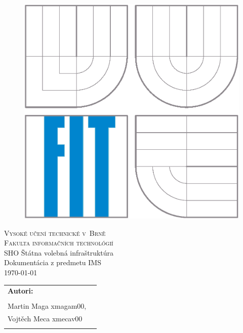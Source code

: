 \begin{titlepage}

\begin{figure}[h]
\begin{center}
\includegraphics[scale=0.6]{logo.eps}
\end{center}
\end{figure}

\begin{center}
\LARGE
\textsc{Vysoké učení
  technické v~Brně\\ \Large{Fakulta informačních technológií}}\\
\LARGE
SHO Štátna volebná infraštruktúra \\
\Huge
Dokumentácia z predmetu IMS\\ 
\large{\medskip
\today }\\
\end{center}
 \hfill   

\begin{flushleft}
\begin{large}
\begin{tabular}{ll}
\textbf{Autori:} \\ \\

Martin Maga  xmagam00, \\Vojtěch Meca   xmecav00 \\ \\


\end{tabular}
\end{large}
\end{flushleft}
\end{titlepage}
